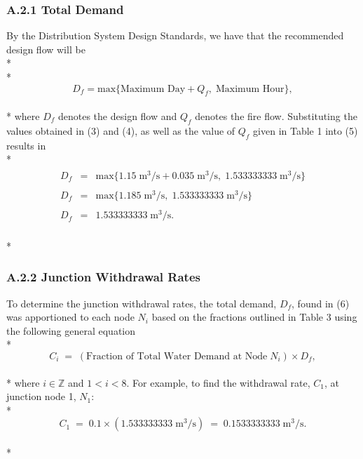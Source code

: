 \documentclass[]{article}
\begin{document}
\subsubsection{A.2.1 Total Demand} 
By the Distribution System Design Standards, we have that the recommended design flow will be \\* \\*
\begin{equation}
D_f = \text{max}\{\text{Maximum Day}+Q_f, \; \text{Maximum Hour}\},
\end{equation} \\* 
where $D_f$ denotes the design flow and $Q_f$ denotes the fire flow. Substituting the values obtained in (3) and (4), as well as the value of $Q_f$ given in Table 1 into (5) results in \\* 
\begin{align}
\begin{array}{rcl}
D_f &=& \text{max}\{1.15 \; \text{m}^3/\text{s} + 0.035 \; \text{m}^3/\text{s}, \; 1.533333333 \; \text{m}^3/\text{s}\} \\ \\
D_f &=& \text{max}\{1.185 \; \text{m}^3/\text{s}, \; 1.533333333 \; \text{m}^3/\text{s}\} \\ \\
D_f &=&  1.533333333  \; \text{m}^3/\text{s}. 
\end{array}
\end{align} \\* 
\subsubsection{A.2.2 Junction Withdrawal Rates}
To determine the junction withdrawal rates, the total demand, $D_f$, found in (6) was apportioned to each node $N_i$ based on the fractions outlined in Table 3 using the following general equation \\* 
\begin{equation}
\nonumber
C_i \; = \; (\text{Fraction of Total Water Demand at Node} \; N_i) \times D_f,
\end{equation} \\* 
where $i \in \mathbb{Z}$ and $1<i<8$. For example, to find the withdrawal rate, $C_1$, at junction node 1, $N_1$: \\* 
\begin{equation}
\nonumber
C_1 \; = \; 0.1 \times (1.533333333  \; \text{m}^3/\text{s}) \; = \; 0.1533333333 \; \text{m}^3/\text{s}. 
\end{equation}  \\*
\end{document}
